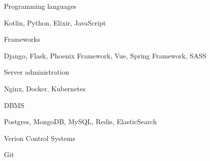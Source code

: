 \begin{cventries}
  \cventry
    {Programming languages}
    {}
    {}
    {}
    {
      \begin{cvitems}
        \item {Kotlin, Python, Elixir, JavaScript}
      \end{cvitems}
    }
  \cventry
    {Frameworks}
    {}
    {}
    {}
    {
      \begin{cvitems}
        \item {Django, Flask, Phoenix Framework, Vue, Spring Framework, SASS}
      \end{cvitems}
    }
  \cventry
    {Server administration}
    {}
    {}
    {}
    {
      \begin{cvitems}
        \item {Nginx, Docker, Kubernetes}
      \end{cvitems}
    }
  \cventry
    {DBMS}
    {}
    {}
    {}
    {
      \begin{cvitems}
        \item {Postgres, MongoDB, MySQL, Redis, ElasticSearch}
      \end{cvitems}
    }
  \cventry
    {Verion Control Systems}
    {}
    {}
    {}
    {
      \begin{cvitems}
        \item {Git}
      \end{cvitems}
    }
\end{cventries}
